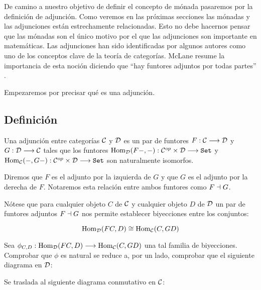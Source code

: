 De camino a nuestro objetivo de definir el concepto de mónada
pasaremos por la definición de adjunción. Como veremos en las próximas
secciones las mónadas y las adjunciones están estrechamente relacionadas.
Esto no debe hacernos pensar que las mónadas son el único motivo
por el que las adjunciones son importante en matemáticas. Las adjunciones
han sido identificadas por algunos autores como uno de los conceptos
clave de la teoría de categorías. McLane resume la importancia de
esta noción diciendo que ``hay funtores adjuntos por todas partes''
\cite{ariseeverywhere}.

Empezaremos por precisar qué es una adjunción.

\subsection{Definición}
\begin{definition}
  Una adjunción entre categorías $\mathcal{C}$ y $\mathcal{D}$ es un par de funtores
  $F : \mathcal{C}\longrightarrow \mathcal{D}$ y $G: \mathcal{D}\longrightarrow \mathcal{C}$ tales que los funtores
  $\operatorname{Hom}_{\mathcal{D}}(F-, -) : \mathcal{C}^{op}\times\mathcal{D}\longrightarrow \texttt{Set}$ y
  $\operatorname{Hom}_{\mathcal{C}}(-, G-) : \mathcal{C}^{op}\times\mathcal{D}\longrightarrow \texttt{Set}$ son naturalmente isomorfos.

  Diremos que $F$ es el
  adjunto por la izquierda de $G$ y que $G$ es el adjunto
  por la derecha de $F$. Notaremos esta relación entre ambos funtores
  como $F \dashv G$.
\end{definition}

Nótese que para cualquier
objeto $C$ de $\mathcal{C}$ y cualquier objeto
$D$ de $\mathcal{D}$ un par de funtores adjuntos $F \dashv G$ nos permite
establecer biyecciones entre los conjuntos:

$$\operatorname{Hom}_{\mathcal{D}}(FC, D) \cong \operatorname{Hom}_{\mathcal{C}}(C, GD)$$

Sea $\phi_{C, D} : \operatorname{Hom}_{\mathcal{D}}(FC, D)\longrightarrow \operatorname{Hom}_{\mathcal{C}}(C, GD)$ una tal
familia de biyecciones. Comprobar que $\phi$ es natural se reduce
a, por un lado, comprobar que el siguiente diagrama en $\mathcal{D}$:

\begin{center}
\end{center}

Se traslada al siguiente diagrama conmutativo en $\mathcal{C}$:

\begin{center}
\end{center}

